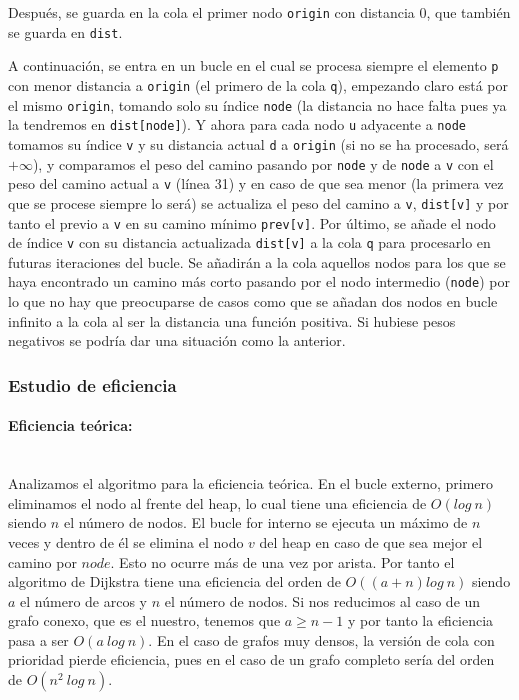 \documentclass{article}
\newcommand{\myparagraph}[1]{\paragraph{#1}\mbox{}\\}
\begin{document}
Después, se guarda en la cola el primer nodo \verb|origin| con distancia 0, que también se guarda en \verb|dist|.

A continuación, se entra en un bucle en el cual se procesa siempre el elemento \verb|p| con menor distancia a \verb|origin| (el primero de la cola \verb|q|), empezando claro está por el mismo \verb|origin|, tomando solo su índice \verb|node| (la distancia no hace falta pues ya la tendremos en \verb|dist[node]|). Y ahora para cada nodo \verb|u| adyacente a \verb|node| tomamos su índice \verb|v| y su distancia actual \verb|d| a \verb|origin| (si no se ha procesado, será $+\infty$), y comparamos el peso del camino pasando por \verb|node| y de \verb|node| a \verb|v| con el peso del camino actual a \verb|v| (línea 31) y en caso de que sea menor (la primera vez que se procese siempre lo será) se actualiza el peso del camino a \verb|v|, \verb|dist[v]| y por tanto el previo a \verb|v| en su camino mínimo \verb|prev[v]|. Por último, se añade el nodo de índice \verb|v| con su distancia actualizada \verb|dist[v]| a la cola \verb|q| para procesarlo en futuras iteraciones del bucle. Se añadirán a la cola aquellos nodos para los que se haya encontrado un camino más corto pasando por el nodo intermedio (\verb|node|) por lo que no hay que preocuparse de casos como que se añadan dos nodos en bucle infinito a la cola al ser la distancia una función positiva. Si hubiese pesos negativos se podría dar una situación como la anterior.

\subsubsection{Estudio de eficiencia}

\myparagraph{Eficiencia teórica:}

Analizamos el algoritmo para la eficiencia teórica. En el bucle externo, primero eliminamos el nodo al frente del heap, lo cual tiene una eficiencia de $O(log\ n)$ siendo $n$ el número de nodos. El bucle for interno se ejecuta un máximo de $n$ veces y dentro de él se elimina el nodo $v$ del heap en caso de que sea mejor el camino por $node$. Esto no ocurre más de una vez por arista. Por tanto el algoritmo de Dijkstra tiene una eficiencia del orden de $O((a+n)log\ n)$ siendo $a$ el número de arcos y $n$ el número de nodos. Si nos reducimos al caso de un grafo conexo, que es el nuestro, tenemos que $a \geq n-1$ y por tanto la eficiencia pasa a ser $O(a\ log\ n)$. En el caso de grafos muy densos, la versión de cola con prioridad pierde eficiencia, pues en el caso de un grafo completo sería del orden de $O(n^2\ log\ n)$.
\end{document}
